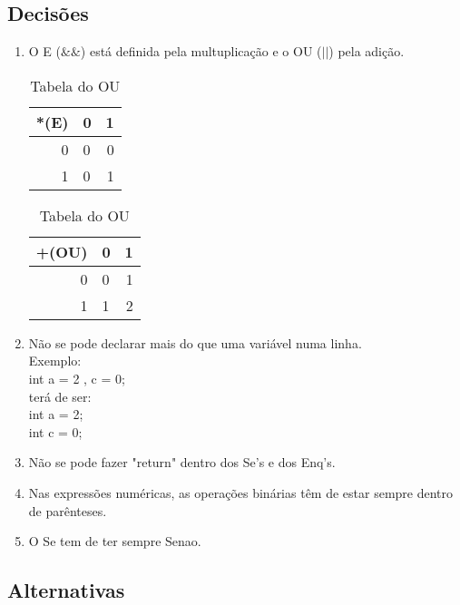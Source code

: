 \documentclass{report}
\begin{document}
\subsection{Decisões}
\begin{enumerate}[1)]
	\item O E ($\&\&$) está definida pela multuplicação e o OU ($||$) pela adição.
 
	 \begin{table}[h]
		\begin{center}
	 	\caption{Tabela do E}
	 	\begin{tabular}{r|lr}
	 	 *(E)& 0 & 1\\ %
	 	\hline          %
	 	0 & 0 & 0 \\
	 	1 & 0 & 1\\
 	
		\end{tabular}
		\caption{Tabela do OU}
		\begin{tabular}{r|lr}
		+(OU)& 0 & 1\\ %
		\hline          %
		0 & 0 & 1 \\
		1 & 1 & 2\\
		\end{tabular}
		\end{center}
	\end{table}

	\item Não se pode declarar mais do que uma variável numa linha.\\
	 Exemplo: \\int a = 2 , c = 0;\\ terá de ser:\\
	 int a = 2;\\
	 int c = 0;\\
	 \item Não se pode fazer "return" dentro dos Se's e dos Enq's.\\ 
	 \item Nas expressões numéricas, as operações binárias têm de estar sempre dentro de parênteses.
	 \item O Se tem de ter sempre Senao.
	
\end{enumerate}


\subsection{Alternativas}
\end{document}
